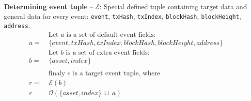 \documentclass[12pt]{report}
\newcommand{\hlc}[1]{\colorbox{white!25}{#1}}
\def\code#1{\colorbox{light-gray}{\texttt{#1}}}
\begin{document}
\textbf{\hlc{Determining} event tuple } – $\mathcal{E}$:\hfill\null\linebreak
Special defined tuple containing target data and general data for every event: \code{event}, \code{txHash}, \code{txIndex}, \code{blockHash}, \code{blockHeight}, \code{address}.
\begin{align}
&\ \text{Let } a \text{ is a set of default event fields: } \nonumber\\
a =&\ \{event, txHash, txIndex, blockHash, blockHeight, address\} \nonumber\\
&\ \text{Let } b \text{ is a set of extra event fields: } \nonumber\\
b =&\ \{asset, index\} \nonumber\\
&\ \nonumber\\
&\ \text{finaly } e \text{ is a target event tuple, where} \nonumber\\
r =&\ \mathcal{E}(b) \\
r =&\ \mathcal{O}(\{asset, index\} \ \cup \ a)
\end{align}

\end{document}

